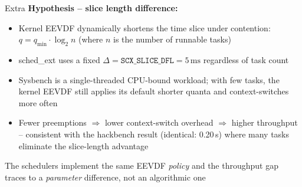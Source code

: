 \documentclass[aspectratio=169]{beamer}
\begin{document}
\begin{frame}{Extra}
        \vspace{0.3cm}
        \textbf{Hypothesis -- slice length difference:}
        \begin{itemize}
                \item Kernel EEVDF dynamically shortens the time slice
                        under contention: $q = q_{\min} \cdot \log_2 n$
                        (where $n$ is the number of runnable tasks)
                \item sched\_ext uses a fixed $\Delta = \texttt{SCX\_SLICE\_DFL} = 5\,\text{ms}$
                        regardless of task count
                \item Sysbench is a single-threaded CPU-bound workload;
                        with few tasks, the kernel EEVDF still applies
                        its default shorter quanta and context-switches more often
                \item Fewer preemptions $\Rightarrow$ lower context-switch overhead
                        $\Rightarrow$ higher throughput -- consistent with
                        the hackbench result (identical: 0.20\,s)
                        where many tasks eliminate the slice-length advantage
        \end{itemize}

        \begin{shadowbox2}
                \footnotesize{The schedulers implement the same EEVDF \emph{policy} and
                the throughput gap traces to a \emph{parameter} difference,
                not an algorithmic one}
        \end{shadowbox2}
\end{frame}
\addtocounter{framenumber}{-1}
\end{document}
